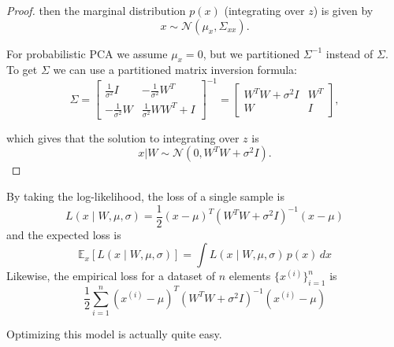 \begin{proof}
    then the marginal distribution $p(x)$ (integrating over $z$) is given by
    \begin{equation}
      x \sim \mathcal{N}(\mu_x, \Sigma_{xx}).
    \end{equation}

    For probabilistic PCA we assume $\mu_x = 0$, but we partitioned $\Sigma^{-1}$ instead of $\Sigma$. To get $\Sigma$ we can use a partitioned matrix inversion formula:
    \begin{equation}
      \Sigma = \begin{bmatrix} \frac{1}{\sigma^2}I & -\frac{1}{\sigma^2}W^T \\ -\frac{1}{\sigma^2}W & \frac{1}{\sigma^2}WW^T + I \end{bmatrix}^{-1} = \begin{bmatrix} W^TW + \sigma^2 I & W^T \\ W & I \end{bmatrix},
    \end{equation}

    which gives that the solution to integrating over $z$ is
    \begin{equation}
      x | W \sim \mathcal{N}(0, W^T W + \sigma^2 I).
    \end{equation}
  \end{proof}

  By taking the log-likelihood, the loss of a single sample is 
  \begin{equation}
    L(x \mid W, \mu, \sigma) = \frac{1}{2} (x - \mu)^T (W^T W + \sigma^2 I)^{-1} (x - \mu)
  \end{equation} 
  and the expected loss is 
  \begin{equation}
    \mathbb{E}_x [ L(x \mid W, \mu, \sigma)] = \int L(x \mid W, \mu, \sigma) \, p(x) \,dx
  \end{equation}
  Likewise, the empirical loss for a dataset of $n$ elements $\{x^{(i)}\}_{i=1}^n$ is 
  \begin{equation}
    \frac{1}{2} \sum_{i=1}^n (x^{(i)} - \mu)^T (W^T W + \sigma^2 I)^{-1} (x^{(i)} - \mu)
  \end{equation}

  Optimizing this model is actually quite easy. 


